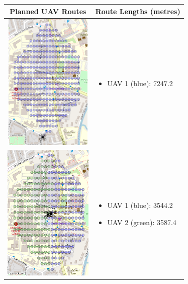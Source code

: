 \begin{table}[h!]
  \centering
  \begin{tabular}{ | c | m{5cm} | }
    \hline
    Planned UAV Routes & Route Lengths (metres) \\
    \hline
    
    \begin{minipage}[c][68mm][c]{.6\textwidth}
      \includegraphics[width=\linewidth, height=66mm]{Chapters/MultiAgentCoverage/MultipleTravellingSalesman/Figs/Hexagon/OneRAV.PNG}
    \end{minipage}
    &
    \begin{itemize}[leftmargin=*]
      \item[] UAV 1 (blue): 7247.2
    \end{itemize}
    \\
    \hline
    \begin{minipage}[c][68mm][c]{.6\textwidth}
      \includegraphics[width=\linewidth, height=66mm]{Chapters/MultiAgentCoverage/MultipleTravellingSalesman/Figs/Hexagon/TwoRAV.PNG}
    \end{minipage}
    &
    \begin{itemize}[leftmargin=*]
        \item[] UAV 1 (blue): 3544.2
        \item[] UAV 2 (green): 3587.4
    \end{itemize}
    \\
    \hline
    

\end{tabular}
\end{table}
